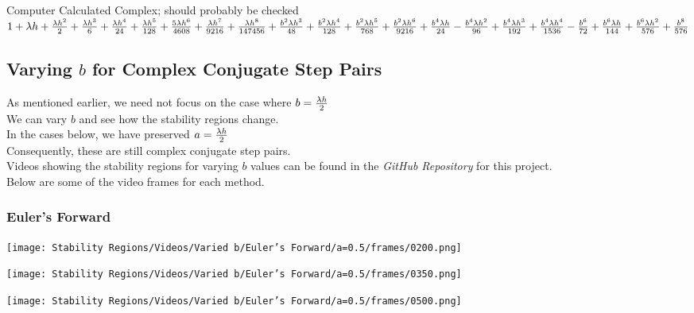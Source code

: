 Computer Calculated Complex; should probably be checked\\
$1 + \lambda h + \frac{\lambda h^2}{2} + \frac{\lambda h^3}{6} + \frac{\lambda h^4}{24} + \frac{\lambda h^5}{128} + \frac{5 \lambda h^6}{4608} + \frac{\lambda h^7}{9216} + \frac{\lambda h^8}{147456} + \frac{b^2 \lambda h^3}{48} + \frac{b^2 \lambda h^4}{128} + \frac{b^2 \lambda h^5}{768} + \frac{b^2 \lambda h^6}{9216} + \frac{b^4 \lambda h}{24} - \frac{b^4 \lambda h^2}{96} + \frac{b^4 \lambda h^3}{192} + \frac{b^4 \lambda h^4}{1536} - \frac{b^6}{72} + \frac{b^6 \lambda h}{144} + \frac{b^6 \lambda h^2}{576} + \frac{b^8}{576}$

\subsection{Varying $b$ for Complex Conjugate Step Pairs}
\par As mentioned earlier, we need not focus on the case where $b = \frac{\lambda h}{2}$\\
We can vary $b$ and see how the stability regions change.\\
In the cases below, we have preserved $a = \frac{\lambda h}{2}$\\
Consequently, these are still complex conjugate step pairs.\\
Videos showing the stability regions for varying $b$ values can be found in the \textit{GitHub Repository}\cite{GitHub_Repo} for this project.\\
Below are some of the video frames for each method.\\
\subsubsection{Euler's Forward}
\begin{multicols}{3}
	\begin{center}
		\texttt{[image: Stability Regions/Videos/Varied b/Euler's Forward/a=0.5/frames/0200.png]}
	\end{center}
	\columnbreak{}
	\begin{center}
		\texttt{[image: Stability Regions/Videos/Varied b/Euler's Forward/a=0.5/frames/0350.png]}
	\end{center}
	\columnbreak{}
	\begin{center}
		\texttt{[image: Stability Regions/Videos/Varied b/Euler's Forward/a=0.5/frames/0500.png]}
	\end{center}
\end{multicols}
